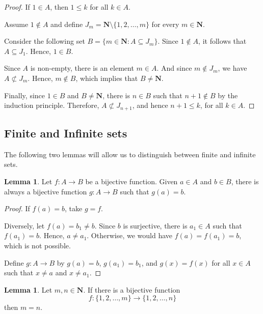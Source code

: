 \documentclass[12pt,a4paper]{article}
\theoremstyle{definition}
\newtheorem{lemma}[theorem]{Lemma}
\begin{document}
\begin{proof}
	If $1 \in A$, then $1 \leq k$ for all $k \in A$.
	
	Assume $1 \notin A$ and define $J_m = \textbf{N} \setminus \{1,2,\ldots, m\}$ for every $m \in \textbf{N}$.
	
	Consider the following set $B = \{ m \in \textbf{N} : A \subseteq J_m \}$. Since $1 \notin A$, it follows that $A \subseteq J_1$. Hence, $1 \in B$. 
	
	Since $A$ is non-empty, there is an element $m \in A$. And since $m \notin J_m$, we have $A \not\subset J_m$. Hence, $m \notin B$, which implies that $B \neq \textbf{N}$. 
	
	Finally, since $1 \in B$ and $B \neq \textbf{N}$, there is $n \in B$ such that $n+1 \notin B$ by the induction principle. Therefore, $A \not\subset J_{n+1}$, and hence $n+1 \leq k$, for all $k \in A$.
\end{proof}

\subsection{Finite and Infinite sets}

The following two lemmas will allow us to distinguish between finite and infinite sets.

\begin{lemma}\label{two-bij-fun}
	Let $f:A \longrightarrow B$ be a bijective function. Given $a \in A$ and $b \in B$, there is always a bijective function $g : A \longrightarrow B$ such that $g(a) = b$.
\end{lemma}

\begin{proof}
	If $f(a)=b$, take $g = f$. 
	
	Diversely, let $f(a) = b_1 \neq b$. Since $b$ is surjective, there is $a_1 \in A$ such that $f(a_1) = b$. Hence, $a \neq a_1$. Otherwise, we would have $f(a) = f(a_1) = b$, which is not possible.
	
	Define $g : A \longrightarrow B$ by $g(a) = b$, $g(a_1) = b_1$, and $g(x) = f(x)$ for all $x \in A$ such that $x \neq a$ and $x \neq a_1$.
\end{proof}

\begin{lemma}\label{snd-lemma}
	Let $m,n \in \textbf{N}$. If there is a bijective function 
	\[
		f : \{ 1, 2, \ldots, m \} \longrightarrow \{ 1, 2, \ldots, n \}
	\]
	then $m=n$.
\end{lemma}
\end{document}
